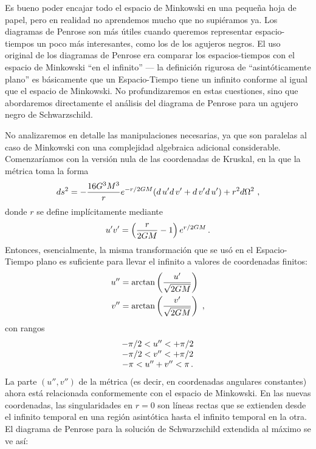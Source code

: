 \documentclass[11pt,b5paper,openany,twoside]{book}
\begin{document}
Es bueno poder encajar todo el espacio de Minkowski en una pequeña hoja de papel, pero en realidad no aprendemos mucho que no supiéramos ya.
Los diagramas de Penrose son más útiles cuando queremos representar espacio-tiempos un poco más interesantes, como los de los agujeros negros.
El uso original de los diagramas de Penrose era comparar los espacios-tiempos con el espacio de Minkowski ``en el infinito'' --- la definición rigurosa de ``asintóticamente plano'' es básicamente que un Espacio-Tiempo tiene un infinito conforme al igual que el espacio de Minkowski.
No profundizaremos en estas cuestiones, sino que abordaremos directamente el análisis del diagrama de Penrose para un agujero negro de Schwarzschild.

No analizaremos en detalle las manipulaciones necesarias, ya que son paralelas al caso de Minkowski con una complejidad algebraica adicional considerable.
Comenzaríamos con la versión nula de las coordenadas de Kruskal, en la que la métrica toma la forma
\begin{equation}
ds^2 =-{{16 G^3M^3}\over{r}}e^{-r/2GM}( d\,u'  d\,v'+  d\,v'  d\,u')
+r^2 d\Omega^2\ , \label{7.103}
\end{equation}
donde $r$ se define implícitamente mediante
\begin{equation}
u'v' = \left({{r}\over{2GM}}-1\right)e^{r/2GM}\,.
\label{7.104}
\end{equation}
Entonces, esencialmente, la misma transformación que se usó en el Espacio-Tiempo plano es suficiente para llevar el infinito a valores de coordenadas finitos:
\begin{align}
u''  &=  \arctan\left({{u'}\over{\sqrt{2GM}}}\right) \notag \\
v''  &=  \arctan\left({{v'}\over{\sqrt{2GM}}}\right)\ ,
\label{7.105}
\end{align}
con rangos
\begin{equation*}
\begin{array}{c}
-\pi/2 < u'' < +\pi/2 \notag \\  -\pi/2 < v'' < +\pi/2 \notag \\
-\pi < u'' + v'' < \pi\,.
\end{array}
\end{equation*}
La parte $(u'',v'')$ de la métrica (es decir, en coordenadas angulares constantes) ahora está relacionada conformemente con el espacio de Minkowski.
En las nuevas coordenadas, las singularidades en $r=0$ son líneas rectas que se extienden desde el infinito temporal en una región asintótica hasta el infinito temporal en la otra.
El diagrama de Penrose para la solución de Schwarzschild extendida al máximo se ve así:
\end{document}

